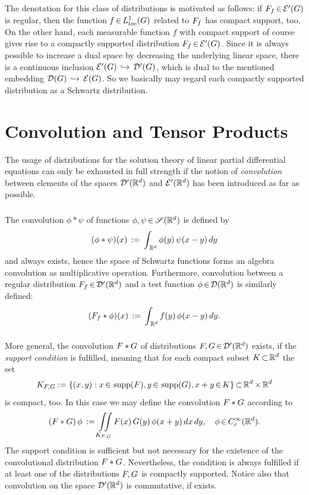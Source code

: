 \documentclass[11pt,twoside]{article}
\begin{document}
\subparagraph{}
The denotation for this class of distributions is motivated as follows:
if $F_f {\,\in\,} {\mathcal{E}}'(G)$ is regular,
then the function $f {\,\in\,} L_{loc}^1(G)$ related to $F_f$
has compact support, too.
On the other hand,
each measurable function $f$ with compact support of course
gives rise to a compactly supported distribution $F_f {\,\in\,} {\mathcal{E}}'(G)$.
Since it is always possible to increase a dual space
by decreasing the underlying linear space,
there is a continuous inclusion ${\mathcal{E}}'(G) \, \hookrightarrow \, {\mathcal{D}}'(G)$,
which is dual to the mentioned embedding
${\mathcal{D}}(G) \, \hookrightarrow \, {\mathcal{E}}(G)$.
So we basically may regard
each compactly supported distribution as a Schwartz distribution.

\section{Convolution and Tensor Products}                                      %
The usage of distributions for the solution theory of linear partial
differential equations can only be exhausted in full strength
if the notion of \textit{convolution} between elements
of the spaces ${\mathcal{D}}'({\mathbb{R}}^d)$ and ${\mathcal{E}}'({\mathbb{R}}^d)$ has been introduced
as far as possible.

\subparagraph{}
The convolution $\phi \ast \psi$ of functions $\phi, \psi {\,\in\,} \mathscr{S}({\mathbb{R}}^d)$
is defined by
\[
(\phi \ast \psi) (x) \,:=\, \int_{\,{\mathbb{R}}^d} \phi(y) \, \psi(x-y) \, dy
\]
and always exists,
hence the space of Schwartz functions forms an algebra
{\wrt} convolution as multiplicative operation.
Furthermore,
convolution between a regular distribution
$F_f {\,\in\,} {\mathcal{D}}'({\mathbb{R}}^d)$ and a test function $\phi {\,\in\,} {\mathcal{D}}({\mathbb{R}}^d)$
is similarly defined:
\[
(F_f \ast \phi) (x) \,:=\, \int_{\,{\mathbb{R}}^d} f(y) \, \phi(x-y) \, dy.
\]

\subparagraph{}
More general,
the convolution $F * G$ of distributions
$F, G {\,\in\,} {\mathcal{D}}'({\mathbb{R}}^d)$ exists,
if the \textit{support condition} is fulfilled,
meaning that for each compact subset $K {\,\subset\,} {\mathbb{R}}^d$ the set
\[
K_{F,G} :=
\{(x,y): x {\,\in\,} \operatorname{supp}(F), y {\,\in\,} \operatorname{supp}(G), x+y {\,\in\,} K \}
{\,\subset\,} {\mathbb{R}}^d {\,\times\,} {\mathbb{R}}^d
\]
is compact, too.
In this case we may define the convolution $F \ast G$ according to
\[
(F \ast G) \, \phi \,:=\,
\iint \limits_{{K}_{F,G}}
F(x)\,G(y)\,\phi(x+y) \, dx \, dy, \quad \phi {\,\in\,} C_c^{\infty}({\mathbb{R}}^d).
\]
The support condition is sufficient
but not necessary for the existence of the convolutional distribution
$F \ast G$.
Nevertheless,
the condition is always fulfilled
if at least one of the distributions $F, G$
is compactly supported.
Notice also that
convolution on the space ${\mathcal{D}}'({\mathbb{R}}^d)$ is commutative, if exists.
\end{document}
